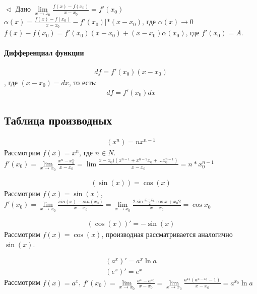 \documentclass[10pt]{article}
\begin{document}
		$\vartriangleleft$ Дано  $\lim\limits_{x \to x_0} \frac{f(x) - f(x_0)}{x - x_0} = f'(x_0)$\\
		$\alpha(x) = \frac{f(x) - f(x_0)}{x - x_0} - f'(x_0) | *(x-x_0)$, где $\alpha(x) \to 0$\\
		$f(x) - f(x_0) = f'(x_0)(x-x_0) + (x-x_0)\alpha(x_0)$, где $f'(x_0) =A$.
		
		\paragraph{Дифференциал функции} \textit{}
		\begin{eqnarray}
			\nonumber df = f'(x_0)(x-x_0)
		\end{eqnarray}, где $(x-x_0) = dx$, то есть:
		\begin{eqnarray}
			df = f'(x_0)dx
		\end{eqnarray}
		
		\subsection{Таблица производных}
			\begin{eqnarray}
				(x^n) = nx^{n-1}
			\end{eqnarray}
			Рассмотрим $f(x) = x^n$, где $n \in N$. \\
			$f'(x_0) = \lim\limits_{x \to x_0} \frac{x^n - x_0^n}{x - x_0} = \lim \frac{x-x_0)(x^{n-1} + x^{n-2}x_0 + \dots x_0^{n-1})}{x - x_0} = n*x_0^{n-1}$
			
			\begin{eqnarray}
				(\sin(x)) = \cos(x)
			\end{eqnarray}
			Рассмотрим $f(x) = \sin(x)$, $f'(x_0) = \lim\limits_{x \to x_0} \frac{sin(x) - sin(x_0)}{x - x_0} = \lim\limits_{x \to x_0} \frac{2\sin\frac{x-x_0}{2}\cos{x+x_0}{2}}{x-x_0} = \cos{x_0}$ 
			
			\begin{eqnarray}
				(\cos(x))' = -\sin(x)
			\end{eqnarray}
			Рассмотрим $f(x) = \cos(x)$, производная рассматривается аналогично $\sin(x)$.
			
			\begin{eqnarray}
				(a^x)' = a^{x}\ln a\\
				(e^x)' = e^{x}
			\end{eqnarray}
			Рассмотрим $f(x) = a^x$, $f'(x_0) = \lim\limits_{x \to x_0} \frac{a^x - a^{x_0}}{x-x_0} = \lim\limits_{x \to x_0} \frac{a^{x_0}(a^{x - x_0} - 1)}{x - x_0} = a^{x_0}\ln a$
			
\end{document}

